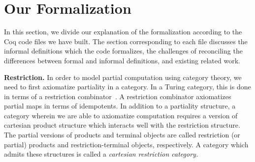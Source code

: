 \documentclass{entcs} \usepackage{entcsmacro}
\begin{document}
\section{Our Formalization}

%

In this section, we divide our explanation of the formalization
according to the Coq code files we have built. The section
corresponding to each file discusses the informal definitions which
the code formalizes, the challenges of reconciling the differences
between formal and informal definitions, and existing related work.

{\bfseries Restriction.} In order to model partial computation using category theory, we need to first axiomatize partiality in a category. In a Turing category, this is done in terms of a restriction combinator~\cite{Restriction}. A restriction combinator axiomatizes partial maps in terms of idempotents. In addition to a partiality structure, a category wherein we are able to axiomatize computation requires a version of cartesian product structure which interacts well with the restriction structure. The partial versions of products and terminal objects are called restriction (or partial) products and restriction-terminal objects, respectively. A category which admits these structures is called a {\em cartesian restriction category.} 

\end{document}
